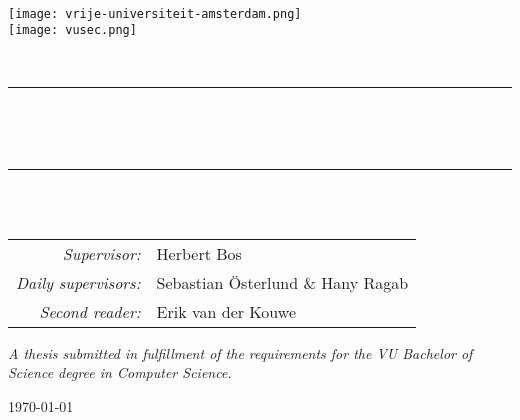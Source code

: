 \begin{titlepage}
    \newcommand{\HRule}{\rule{0.8\linewidth}{0.2mm}}

    \centering

    \vspace*{1em}
    \textsc{\large \theinstitution}\\[1em]

    \texttt{[image: vrije-universiteit-amsterdam.png]} \\[2em]
    \texttt{[image: vusec.png]}

    \vspace{4em}
    \textsc{\Large \thesubject}\\
    \vspace{4em}

    \HRule\\[0.7cm]

    \begin{minipage}{0.75\textwidth}
      \centering
      \setlength{\baselineskip}{2em}
      {\LARGE\bfseries \thetitle}\\[1em]
      \vspace{1em}
    \end{minipage}

    \HRule\\[1.5cm]

    {\Large \theauthor}\\
    \vspace{2em}
    \begin{minipage}{0.72\textwidth}
      \large
      \centering
      \begin{tabular}{ r l }
        \textit{Supervisor:}        & Herbert Bos \\
        \textit{Daily supervisors:} & Sebastian \"{O}sterlund \& Hany Ragab \\
        \textit{Second reader:}     & Erik van der Kouwe
      \end{tabular}
    \end{minipage}

    \vfill
    \begin{minipage}{0.8\textwidth}
      \centering
      \textit{\large
        A thesis submitted in fulfillment of the requirements for the VU Bachelor of Science degree in Computer Science.
      }
    \end{minipage}

    \vspace{2em}
    {\large\today}

    \vspace{4em}
\end{titlepage}
